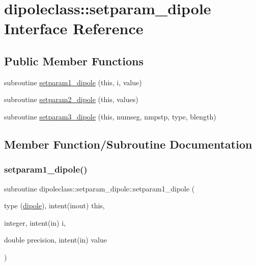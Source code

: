 \hypertarget{interfacedipoleclass_1_1setparam__dipole}{}\section{dipoleclass\+::setparam\+\_\+dipole Interface Reference}
\label{interfacedipoleclass_1_1setparam__dipole}
\subsection*{Public Member Functions}
\begin{DoxyCompactItemize}
\item 
subroutine \mbox{\hyperlink{interfacedipoleclass_1_1setparam__dipole_aa1e6ae56bb82a98f8271a1f50516b67f}{setparam1\+\_\+dipole}} (this, i, value)
\item 
subroutine \mbox{\hyperlink{interfacedipoleclass_1_1setparam__dipole_a3f5aee86e405957edcda5168e4954ecb}{setparam2\+\_\+dipole}} (this, values)
\item 
subroutine \mbox{\hyperlink{interfacedipoleclass_1_1setparam__dipole_a0ca4bd9bdf486dc6ac36486c5efeb056}{setparam3\+\_\+dipole}} (this, numseg, nmpstp, type, blength)
\end{DoxyCompactItemize}


\subsection{Member Function/\+Subroutine Documentation}
\mbox{\label{interfacedipoleclass_1_1setparam__dipole_aa1e6ae56bb82a98f8271a1f50516b67f}} 
\subsubsection{\texorpdfstring{setparam1\_dipole()}{setparam1\_dipole()}}
{\footnotesize\ttfamily subroutine dipoleclass\+::setparam\+\_\+dipole\+::setparam1\+\_\+dipole (\begin{DoxyParamCaption}\item[{type (\mbox{\hyperlink{namespacedipoleclass_structdipoleclass_1_1dipole}{dipole}}), intent(inout)}]{this,  }\item[{integer, intent(in)}]{i,  }\item[{double precision, intent(in)}]{value }\end{DoxyParamCaption})}

